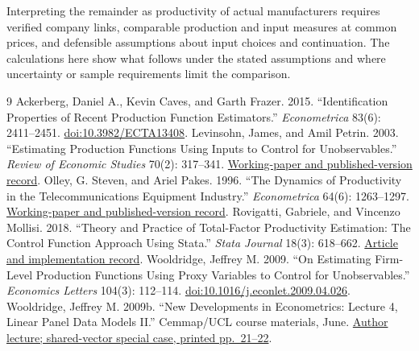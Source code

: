 Interpreting the remainder as productivity of actual manufacturers requires verified company links, comparable production and input measures at common prices, and defensible assumptions about input choices and continuation. The calculations here show what follows under the stated assumptions and where uncertainty or sample requirements limit the comparison.

\begin{thebibliography}{9}
 Ackerberg, Daniel A., Kevin Caves, and Garth Frazer. 2015. ``Identification Properties of Recent Production Function Estimators.'' \textit{Econometrica} 83(6): 2411--2451. \href{https://doi.org/10.3982/ECTA13408}{doi:10.3982/ECTA13408}.
 Levinsohn, James, and Amil Petrin. 2003. ``Estimating Production Functions Using Inputs to Control for Unobservables.'' \textit{Review of Economic Studies} 70(2): 317--341. \href{https://www.nber.org/papers/w7819}{Working-paper and published-version record}.
 Olley, G. Steven, and Ariel Pakes. 1996. ``The Dynamics of Productivity in the Telecommunications Equipment Industry.'' \textit{Econometrica} 64(6): 1263--1297. \href{https://www.nber.org/papers/w3977}{Working-paper and published-version record}.
 Rovigatti, Gabriele, and Vincenzo Mollisi. 2018. ``Theory and Practice of Total-Factor Productivity Estimation: The Control Function Approach Using Stata.'' \textit{Stata Journal} 18(3): 618--662. \href{https://www.stata-journal.com/article.html?article=st0537}{Article and implementation record}.
 Wooldridge, Jeffrey M. 2009. ``On Estimating Firm-Level Production Functions Using Proxy Variables to Control for Unobservables.'' \textit{Economics Letters} 104(3): 112--114. \href{https://doi.org/10.1016/j.econlet.2009.04.026}{doi:10.1016/j.econlet.2009.04.026}.
 Wooldridge, Jeffrey M. 2009b. ``New Developments in Econometrics: Lecture 4, Linear Panel Data Models II.'' Cemmap/UCL course materials, June. \href{https://www.cemmap.ac.uk/wp-content/legacy/resources/imbens_wooldridge/slides_4.pdf}{Author lecture; shared-vector special case, printed pp.~21--22}.
\end{thebibliography}

\GOneEnd
